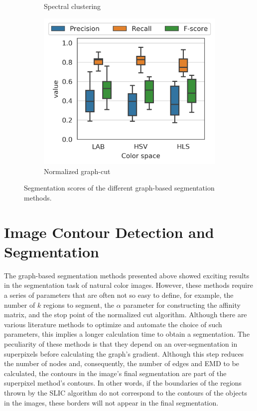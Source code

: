 \documentclass[journal]{IEEEtran}
\begin{document}
\begin{figure}[!ht]
\begin{subfigure}[b]{0.3\textwidth}
        \caption{Spectral clustering}
    \end{subfigure}\hfill     
    \begin{subfigure}[b]{0.3\textwidth}
    	\centering
        \includegraphics[width=\textwidth]{Normalized_graphcut_scores_global_complete_boxplot}
        \caption{Normalized graph-cut}
    \end{subfigure} 
        	    
    \caption{Segmentation scores of the different graph-based segmentation methods.}\label{fig:boxplot_score_methods}    
\end{figure}

\section{Image Contour Detection and Segmentation}

The graph-based segmentation methods presented above showed exciting results in the segmentation task of natural color images. However, these methods require a series of parameters that are often not so easy to define, for example, the number of $k$ regions to segment, the $\alpha$ parameter for constructing the affinity matrix, and the stop point of the normalized cut algorithm. Although there are various literature methods to optimize and automate the choice of such parameters, this implies a longer calculation time to obtain a segmentation. The peculiarity of these methods is that they depend on an over-segmentation in superpixels before calculating the graph's gradient. Although this step reduces the number of nodes and, consequently, the number of edges and EMD to be calculated, the contours in the image's final segmentation are part of the superpixel method's contours. In other words, if the boundaries of the regions thrown by the SLIC algorithm do not correspond to the contours of the objects in the images, these borders will not appear in the final segmentation. 
\end{document}
